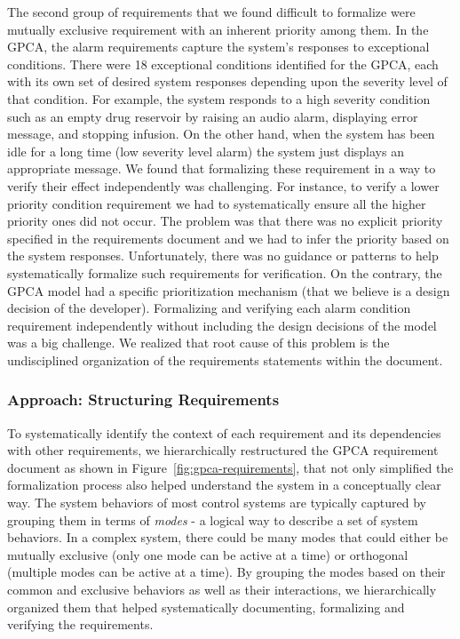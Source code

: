 The second group of requirements that we found difficult to formalize were mutually exclusive requirement with an inherent priority among them. In the GPCA, the alarm requirements capture the system's responses to exceptional conditions. There were 18 exceptional conditions identified for the GPCA, each with its own set of desired system responses depending upon the severity level of that condition. For example, the system responds to a high severity condition such as an empty drug reservoir by raising an audio alarm, displaying error message, and stopping infusion. On the other hand, when the system has been idle for a long time (low severity level alarm) the system just displays an appropriate message. We found that formalizing these requirement in a way to verify their effect independently was challenging. For instance, to verify a lower priority condition requirement we had to systematically ensure all the higher priority ones did not occur. The problem was that there was no explicit priority specified in the requirements document and we had to infer the priority based on the system responses. Unfortunately, there was no guidance or patterns to help systematically formalize such requirements for verification. On the contrary, the GPCA model had a specific prioritization mechanism (that we believe is a design decision of the developer). Formalizing and verifying each alarm condition requirement independently without including the design decisions of the model was a big challenge. We realized that root cause of this problem is the undisciplined organization of the requirements statements within the document.
\vspace{-0.1in}
\subsubsection {Approach: Structuring Requirements}

To systematically identify the context of each requirement and its dependencies with other requirements, we hierarchically restructured the GPCA requirement document as shown in Figure~\ref{fig:gpca-requirements}, that not only simplified the formalization process also helped understand the system in a conceptually clear way. The system behaviors of most control systems are typically captured by grouping them in terms of \emph{modes} - a logical way to describe a set of system behaviors. In a complex system, there could be many modes that could either be mutually exclusive (only one mode can be active at a time) or orthogonal (multiple modes can be active at a time). By grouping the modes based on their common and exclusive behaviors as well as their interactions, we hierarchically organized them that helped systematically documenting, formalizing and verifying the requirements.

